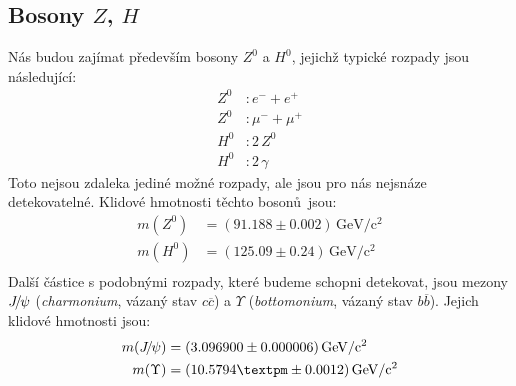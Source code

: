 \documentclass[10pt,a4paper]{article}
\renewcommand{\U}[1]{\ensuremath{\,\mathrm{#1}}}
\newcommand{\°}{\degree}
\newcommand{\Jpsi}{\ensuremath{J \hspace{-2pt} / \hspace{-1pt} \psi}}
\begin{document}
\subsection{Bosony \texorpdfstring{$Z$, $H$}{Z, H}}
Nás budou zajímat především bosony $Z^0$ a $H^0$, jejichž typické rozpady jsou následující:
\begin{align*}
    Z^0 &: e^- + e^+ \\
    Z^0 &: \mu^- + \mu^+ \\
    H^0 &: 2 \, Z^0 \\
    H^0 &: 2 \, \gamma
\end{align*}
Toto nejsou zdaleka jediné možné rozpady, ale jsou pro nás nejsnáze detekovatelné. Klidové hmotnosti těchto bosonů~jsou:
\begin{align*}
    m(Z^0) &= (91.188 \pm 0.002) \U{GeV/c^2} \\
    m(H^0) &= (125.09 \pm 0.24) \U{GeV/c^2} \\
\end{align*}
Další částice s podobnými rozpady, které budeme schopni detekovat, jsou mezony $\Jpsi$ (\textit{charmonium}, vázaný stav $c\overline c$) a $\Upsilon$ (\textit{bottomonium}, vázaný stav $b\overline b$). Jejich klidové hmotnosti jsou:
\begin{align*}
    m(\Jpsi) &= (3.096900 \pm 0.000006) \U{GeV/c^2} \\
    m(\Upsilon) &= (10.5794± \pm 0.0012) \U{GeV/c^2} \\
\end{align*}
\end{document}
